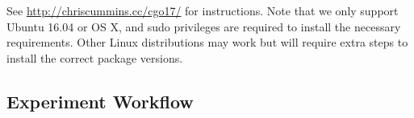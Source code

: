 See \url{http://chriscummins.cc/cgo17/} for instructions. Note that we only support Ubuntu 16.04 or OS X, and sudo privileges are required to install the necessary requirements. Other Linux distributions may work but will require extra steps to install the correct package versions.

%
%
%

\clearpage
\subsection{Experiment Workflow}\label{subsec:workflow}

